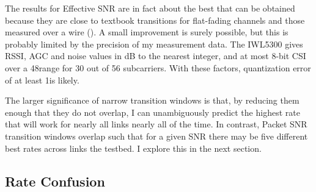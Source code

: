 The results for Effective SNR are in fact about the best that can be obtained because they are close to textbook transitions for flat-fading channels and those measured over a wire (). A small improvement is surely possible, but this is probably limited by the precision of my measurement data. The IWL5300 gives RSSI, AGC and noise values in dB to the nearest integer, and at most 8-bit CSI over a 48\dB range for 30 out of 56 subcarriers. With these factors, quantization error of at least 1\dB is likely.

The larger significance of narrow transition windows is that, by reducing them enough that they do not overlap, I can unambiguously predict the highest rate that will work for nearly all links nearly all of the time. In contrast, Packet SNR transition windows overlap such that for a given SNR there may be five different best rates across links the testbed. I explore this in the next section.


\subsection{Rate Confusion}
\label{sec:rate_confusion}

